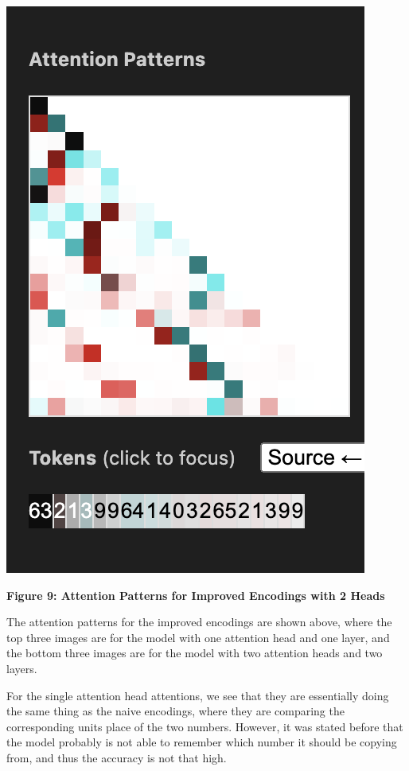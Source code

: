 \documentclass{article}
\begin{document}
\begin{center}
    \includegraphics[scale=0.4]{images/att_encoding_2hd3.png}

    \textbf{Figure 9: Attention Patterns for Improved Encodings with 2 Heads}
\end{center}

The attention patterns for the improved encodings are shown above, where the top three images are for the model with one attention head and one layer, and the bottom three images are for the model with two attention heads and two layers.

For the single attention head attentions, we see that they are essentially doing the same thing as the naive encodings, where they are comparing the corresponding units place of the two numbers. However, it was stated before that the model probably is not able to remember which number it should be copying from, and thus the accuracy is not that high.
\end{document}
